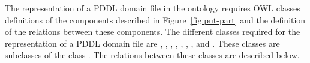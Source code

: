 The representation of a PDDL domain file in the ontology requires OWL classes definitions of the components described in Figure~\ref{fig:put-part} and the definition of the relations between these components. The different classes required for the representation of a PDDL domain file are , , , , , , , and . These classes are subclasses of the class . The relations between these classes are described below.

